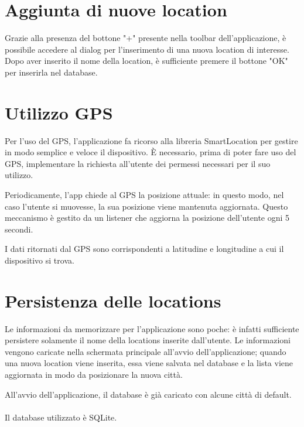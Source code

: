 \documentclass[twoside]{supsistudent}
\begin{document}
\section{Aggiunta di nuove location}
Grazie alla presenza del bottone "+" presente nella toolbar dell'applicazione, è possibile accedere al dialog per l'inserimento di una nuova location di interesse. Dopo aver inserito il nome della location, è sufficiente premere il bottone "OK" per inserirla nel database.

\section{Utilizzo GPS}
Per l'uso del GPS, l'applicazione fa ricorso alla libreria SmartLocation per gestire in modo semplice e veloce il dispositivo. \`E necessario, prima di poter fare uso del GPS, implementare la richiesta all'utente dei permessi necessari per il suo utilizzo.

Periodicamente, l'app chiede al GPS la posizione attuale: in questo modo, nel caso l'utente si muovesse, la sua posizione viene mantenuta aggiornata. Questo meccanismo è gestito da un listener che aggiorna la posizione dell'utente ogni 5 secondi.

I dati ritornati dal GPS sono corrispondenti a latitudine e longitudine a cui il dispositivo si trova.

\section{Persistenza delle locations}
Le informazioni da memorizzare per l'applicazione sono poche: è infatti sufficiente persistere solamente il nome della locations inserite dall'utente.
Le informazioni vengono caricate nella schermata principale all'avvio dell'applicazione; quando una nuova location viene inserita, essa viene salvata nel database e la lista viene aggiornata in modo da posizionare la nuova città.

All'avvio dell'applicazione, il database è già caricato con alcune città di default.
\\\\
Il database utilizzato è SQLite.
\end{document}
